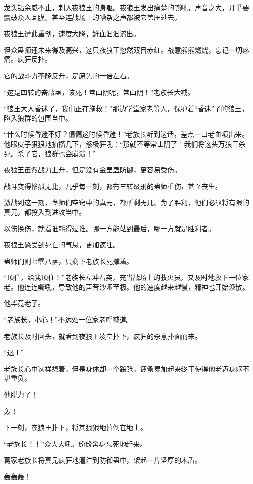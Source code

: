 \begin{this_body}
龙头钻余威不止，刺入夜狼王的身躯。夜狼王发出痛楚的嘶吼，声音之大，几乎要震破众人耳膜。甚至连战场上的嘈杂之声都被它盖压过去。

夜狼王遭此重创，速度大降，鲜血汩汩流出。

但众蛊师还未来得及高兴，这只夜狼王忽然双目赤红。战意熊熊燃烧，忘记一切疼痛。疯狂反扑。

它的战斗力不降反升，是原先的一倍左右。

“这是四转的奋战蛊，该死！常山阴呢，常山阴！”老族长大喊。

“狼王大人昏迷了，我们正在施救！”那边学堂家老等人，保护着“昏迷”了的狼王，陷入狼群的包围当中。

“什么时候昏迷不好？偏偏这时候昏迷！”老族长听到这话，差点一口老血喷出来。他眼皮子狠狠地抽搐几下，怒极狂吼：“那就不等常山阴了！我们将这头万狼王杀死。杀了它，狼群也会崩溃！”

夜狼王虽然战力上升，但是没有金罡蛊防御，更容易受伤。

战斗变得惨烈无比，几乎每一刻，都有三转级别的蛊师重伤，甚至丧生。

激战到这一刻，蛊师们空窍中的真元，都所剩无几。为了胜利，他们必须将有限的真元，都投入到进攻当中。

以伤换伤，就看谁耗得过谁。哪一方能站到最后，哪一方就是胜利者。

夜狼王感受到死亡的气息，更加疯狂。

蛊师们则七零八落，只剩下老族长死撑着。

“顶住，给我顶住！”老族长左冲右突，充当战场上的救火员，又及时地救下一位家老。他连连嘶吼，导致他的声音沙哑至极。他的速度越来越慢，精神也开始涣散。

他毕竟老了。

“老族长，小心！”不远处一位家老呼喊道。

老族长及时回头，就看到夜狼王凌空扑下，疯狂的杀意扑面而来。

“退！”

老族长心中这样想着，但是身体却一个踉跄，疲惫累加起来终于使得他老迈身躯不堪重负。

他脱力了！

轰！

下一刻，夜狼王扑下，将其狠狠地拍倒在地上。

“老族长！！”众人大吼，纷纷舍身忘死地赶来。

葛家老族长将真元疯狂地灌注到防御蛊中，架起一片坚厚的木盾。

轰轰轰！


\end{this_body}

